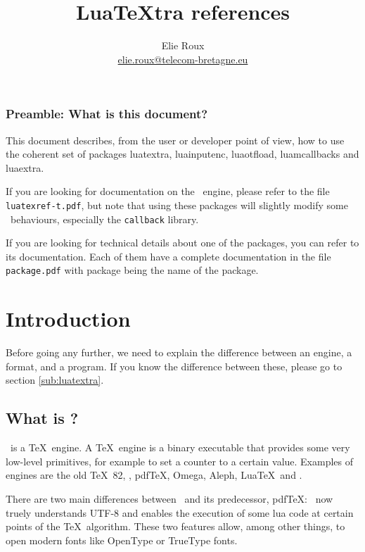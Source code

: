 \documentclass{article}
\title{Lua\TeX tra references}
\author{Elie Roux \\ \url{elie.roux@telecom-bretagne.eu}}
\makeatletter
\newlength\xxt@kern@Te
\newlength\xxt@kern@eX
\newlength\xxt@lower@e
\DeclareRobustCommand\XeTeX{%
  \leavevmode
  \smash{%
   X\lower\xxt@lower@e
   \hbox{\kern\xxt@kern@eX
   \setbox0=\hbox{E}\dimen0=\ht0\advance\dimen0by\dp0%
   \raise\dimen0\hbox{\rotatebox{180}{\box0}}%
   }\kern\xxt@kern@Te\TeX}}%
\makeatother
\begin{document}
\maketitle

\subsubsection*{Preamble: What is this document?}

This document describes, from the user or developer point of view, how to use
the coherent set of packages \textsf{luatextra}, \textsf{luainputenc},
\textsf{luaotfload}, \textsf{luamcallbacks} and \textsf{luaextra}.

If you are looking for documentation on the \LuaTeX\ engine, please refer to
the file \texttt{luatexref-t.pdf}, but note that using these packages will
slightly modify some \LuaTeX\ behaviours, especially the \texttt{callback}
library.

If you are looking for technical details about one of the packages, you can
refer to its documentation. Each of them have a complete documentation in the
file \texttt{package.pdf} with package being the name of the package.

\tableofcontents

\section{Introduction}

Before going any further, we need to explain the difference between an engine,
a format, and a program. If you know the difference between these, please go
to section \ref{sub:luatextra}.

\subsection{What is \LuaTeX ?}

\LuaTeX\ is a \TeX\ engine. A \TeX\ engine is a binary executable that
provides some very low-level primitives, for example \texttt{\string\count} to
set a counter to a certain value. Examples of engines are the old \TeX\ 82,
\eTeX, pdf\TeX, Omega, Aleph, Lua\TeX\ and \XeTeX . 

There are two main differences between \LuaTeX\ and its predecessor, pdfTeX:
\LuaTeX\ now truely understands UTF-8 and enables the execution of some lua
code at certain points of the \TeX\ algorithm. These two features allow, among
other things, to open modern fonts like OpenType or TrueType fonts.
\end{document}
